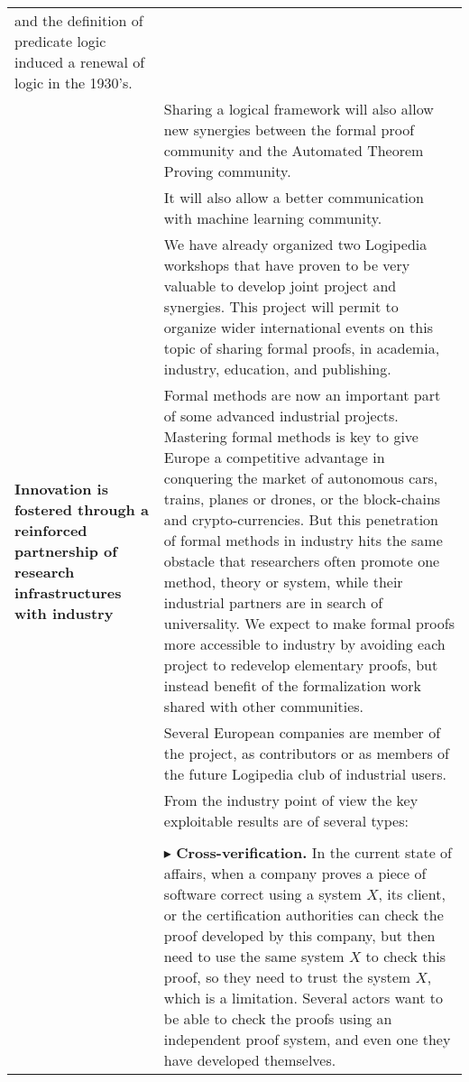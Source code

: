 \begin{longtable}{|p{}|p{}|}
and the definition of predicate logic induced a renewal of logic in
the 1930's.\\
&
\hspace{0.4cm}
Sharing a logical framework will also allow new synergies between 
the formal proof community and the Automated Theorem Proving community.\\
&
\hspace{0.4cm}
It will also allow a better communication with machine learning community.\\
&
\hspace{0.4cm}
We have already organized two Logipedia workshops that have proven to
be very valuable to develop joint project and synergies.  This project
will permit to organize wider international events on this topic of
sharing formal proofs, in academia, industry, education, and
publishing.\\
\hline
{\bf Innovation is fostered through a reinforced partnership of
research infrastructures with industry}
&
Formal methods are now an important part of some advanced industrial
projects. Mastering formal methods is key to give Europe a competitive
advantage in conquering the market of autonomous cars, trains, planes
or drones, or the block-chains and crypto-currencies. But this
penetration of formal methods in industry hits the same obstacle that
researchers often promote one method, theory or system, while their
industrial partners are in search of universality. We expect to make
formal proofs more accessible to industry by avoiding each project to
redevelop elementary proofs, but instead benefit of the formalization
work shared with other communities.\\
&
\hspace{0.4cm}
Several European companies are member of the project,
as contributors or as members of the future Logipedia
club of industrial users.\\
&
\hspace{0.4cm}
From the industry point of view the key exploitable results are of several
types:\\
&\\
&
$\blacktriangleright$ 
{\bf Cross-verification.}
In the current state of affairs, when a company proves a piece of
software correct using a system $X$, its client, or the certification
authorities can check the proof developed by this company, but then
need to use the same system $X$ to check this proof, so they need to
trust the system $X$, which is a limitation. Several actors want to be
able to check the proofs using an independent proof system, and even
one they have developed themselves.


\end{longtable}
